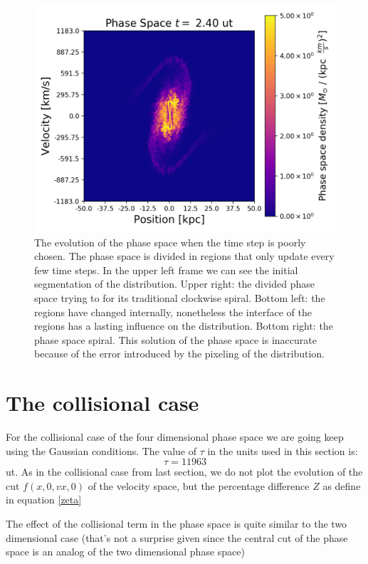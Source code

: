 \begin{figure}[h!]
    \includegraphics[scale=0.45]{imag/2dBad24.png}
    \caption{The evolution of the phase space when the time step is poorly chosen. The phase space is divided in regions that only update every few time steps. In the upper left frame we can see the initial segmentation of the distribution. Upper right: the divided phase space trying to for its traditional clockwise spiral. Bottom left: the regions have changed internally, nonetheless the interface of the regions has a lasting influence on the distribution. Bottom right: the phase space spiral. This solution of the phase space is inaccurate because of the error introduced by the pixeling of the distribution.}
    \label{2dBadTime}
\end{figure}

\section{The collisional case}

For the collisional case of the four dimensional phase space we are going keep using the Gaussian conditions. The value of $\tau$ in the units used in this section is: $$\tau = 11963$$ ut. As in the collisional case from last section, we do not plot the evolution of the cut $f(x,0,vx,0)$ of the velocity space, but the percentage difference $Z$ as define in equation \ref{zeta}

The effect of the collisional term in the phase space is quite similar to the two dimensional case (that's not a surprise given since the central cut of the phase space is an analog of the two dimensional phase space)









